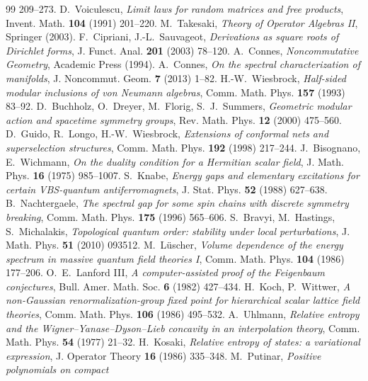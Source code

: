 \documentclass[11pt]{article}
\theoremstyle{definition}
\theoremstyle{remark}
\begin{document}
\begin{thebibliography}{99}
209--273.
 D.~Voiculescu, \emph{Limit laws for random matrices
and free products}, Invent. Math. \textbf{104} (1991) 201--220.
 M.~Takesaki, \emph{Theory of Operator Algebras II},
Springer (2003).
 F.~Cipriani, J.-L.~Sauvageot, \emph{Derivations as
square roots of Dirichlet forms}, J. Funct. Anal. \textbf{201} (2003)
78--120.
 A.~Connes, \emph{Noncommutative Geometry}, Academic
Press (1994).
 A.~Connes, \emph{On the spectral characterization
of manifolds}, J. Noncommut. Geom. \textbf{7} (2013) 1--82.
 H.-W.~Wiesbrock, \emph{Half-sided modular inclusions
of von Neumann algebras}, Comm. Math. Phys. \textbf{157} (1993) 83--92.
 D.~Buchholz, O.~Dreyer, M.~Florig, S.~J.~Summers,
\emph{Geometric modular action and spacetime symmetry groups}, Rev.
Math. Phys. \textbf{12} (2000) 475--560.
 D.~Guido, R.~Longo, H.-W.~Wiesbrock, \emph{Extensions
of conformal nets and superselection structures}, Comm. Math. Phys.
\textbf{192} (1998) 217--244.
 J.~Bisognano, E.~Wichmann, \emph{On the duality
condition for a Hermitian scalar field}, J. Math. Phys. \textbf{16}
(1975) 985--1007.
 S.~Knabe, \emph{Energy gaps and elementary excitations
for certain VBS-quantum antiferromagnets}, J. Stat. Phys. \textbf{52}
(1988) 627--638.
 B.~Nachtergaele, \emph{The spectral gap for some
spin chains with discrete symmetry breaking}, Comm. Math. Phys.
\textbf{175} (1996) 565--606.
 S.~Bravyi, M.~Hastings, S.~Michalakis, \emph{Topological
quantum order: stability under local perturbations}, J. Math. Phys.
\textbf{51} (2010) 093512.
 M.~L\"uscher, \emph{Volume dependence of the energy
spectrum in massive quantum field theories I}, Comm. Math. Phys.
\textbf{104} (1986) 177--206.
 O.~E.~Lanford III, \emph{A computer-assisted proof of
the Feigenbaum conjectures}, Bull. Amer. Math. Soc. \textbf{6} (1982)
427--434.
 H.~Koch, P.~Wittwer, \emph{A non-Gaussian
renormalization-group fixed point for hierarchical scalar lattice field
theories}, Comm. Math. Phys. \textbf{106} (1986) 495--532.
 A.~Uhlmann, \emph{Relative entropy and the
Wigner--Yanase--Dyson--Lieb concavity in an interpolation theory},
Comm. Math. Phys. \textbf{54} (1977) 21--32.
 H.~Kosaki, \emph{Relative entropy of states: a
variational expression}, J. Operator Theory \textbf{16} (1986) 335--348.
 M.~Putinar, \emph{Positive polynomials on compact
}
\end{thebibliography}
\end{document}
